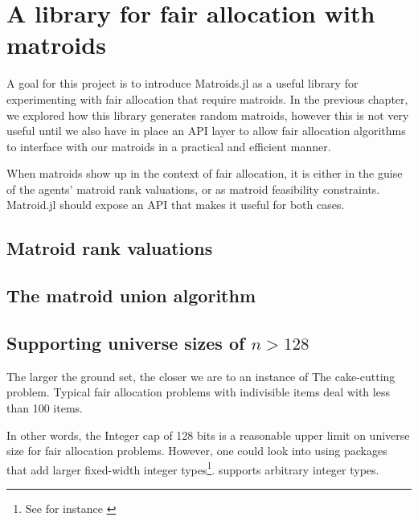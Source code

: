 \chapter{A library for fair allocation with matroids}
A goal for this project is to introduce Matroids.jl as a useful library for experimenting with fair allocation that require matroids. In the previous chapter, we explored how this library generates random matroids, however this is not very useful until we also have in place an API layer to allow fair allocation algorithms to interface with our matroids in a practical and efficient manner.

When matroids show up in the context of fair allocation, it is either in the guise of the agents' matroid rank valuations, or as matroid feasibility constraints. Matroid.jl should expose an API that makes it useful for both cases.

\section{Matroid rank valuations}



\section{The matroid union algorithm}
\skelpars[7]


\section{Supporting universe sizes of \texorpdfstring{$n > 128$}{n > 128}}
The larger the ground set, the closer we are to an instance of The cake-cutting problem. Typical fair allocation problems with indivisible items deal with less than 100 items. 

In other words, the Integer cap of 128 bits is a reasonable upper limit on universe size for fair allocation problems. However, one could look into using packages that add larger fixed-width integer types\footnote{See for instance \href{https://github.com/rfourquet/BitIntegers.jl}{}}.  supports arbitrary integer types. 